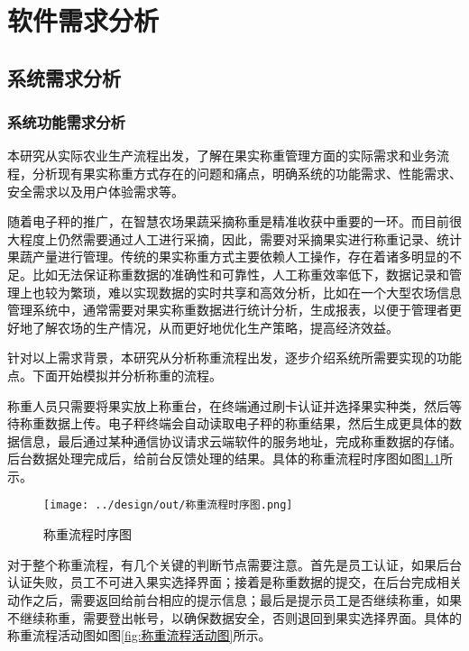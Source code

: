 \chapter{软件需求分析}

\section{系统需求分析}

\subsection{系统功能需求分析}

本研究从实际农业生产流程出发，了解在果实称重管理方面的实际需求和业务流程，分析现有果实称重方式存在的问题和痛点，明确系统的功能需求、性能需求、安全需求以及用户体验需求等。

随着电子秤的推广，在智慧农场果蔬采摘称重是精准收获中重要的一环。而目前很大程度上仍然需要通过人工进行采摘，因此，需要对采摘果实进行称重记录、统计果蔬产量进行管理。传统的果实称重方式主要依赖人工操作，存在着诸多明显的不足。比如无法保证称重数据的准确性和可靠性，人工称重效率低下，数据记录和管理上也较为繁琐，难以实现数据的实时共享和高效分析，比如在一个大型农场信息管理系统中，通常需要对果实称重数据进行统计分析，生成报表，以便于管理者更好地了解农场的生产情况，从而更好地优化生产策略，提高经济效益。

针对以上需求背景，本研究从分析称重流程出发，逐步介绍系统所需要实现的功能点。下面开始模拟并分析称重的流程。

称重人员只需要将果实放上称重台，在终端通过刷卡认证并选择果实种类，然后等待称重数据上传。电子秤终端会自动读取电子秤的称重结果，然后生成更具体的数据信息，最后通过某种通信协议请求云端软件的服务地址，完成称重数据的存储。后台数据处理完成后，给前台反馈处理的结果。具体的称重流程时序图如图\ref{fig:称重流程时序图}所示。

\begin{figure}[H]
    \centering
    \texttt{[image: ../design/out/称重流程时序图.png]}
    \caption{称重流程时序图}
    \label{fig:称重流程时序图}
\end{figure}

对于整个称重流程，有几个关键的判断节点需要注意。首先是员工认证，如果后台认证失败，员工不可进入果实选择界面；接着是称重数据的提交，在后台完成相关动作之后，需要返回给前台相应的提示信息；最后是提示员工是否继续称重，如果不继续称重，需要登出帐号，以确保数据安全，否则退回到果实选择界面。具体的称重流程活动图如图\ref{fig:称重流程活动图}所示。


